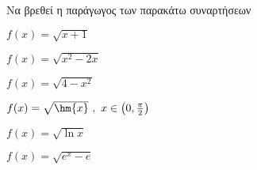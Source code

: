 Να βρεθεί η παράγωγος των παρακάτω συναρτήσεων
\begin{alist}
\item $ f(x)=\sqrt{x+1} $
\item $ f(x)=\sqrt{x^2-2x} $
\item $ f(x)=\sqrt{4-x^2} $
\item $ f(x)=\sqrt{\hm{x}}\ ,\ x\in\left(0,\frac{\pi}{2}\right) $
\item $ f(x)=\sqrt{\ln{x}} $
\item $ f(x)=\sqrt{e^x-e} $
\end{alist}
